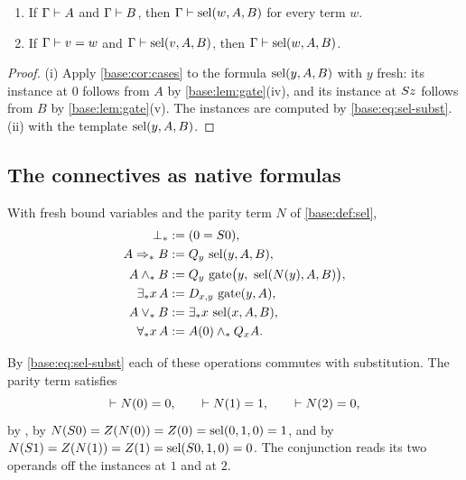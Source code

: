 \begin{lemma}
\label{base:lem:selIE}
\begin{enumerate}[label=\textup{(\roman*)}]
\item If $\Gamma\vdash A$ and $\Gamma\vdash B$, then
 $\Gamma\vdash\operatorname{sel}(w,A,B)$ for every term $w$.
\item If $\Gamma\vdash v=w$ and $\Gamma\vdash\operatorname{sel}(v,A,B)$, then
 $\Gamma\vdash\operatorname{sel}(w,A,B)$.
\end{enumerate}
\end{lemma}

\begin{proof}
(i) Apply \cref{base:cor:cases} to the formula $\operatorname{sel}(y,A,B)$ with $y$ fresh:
its instance at $0$ follows from $A$ by \cref{base:lem:gate}(iv), and its
instance at $S z$ follows from $B$ by \cref{base:lem:gate}(v).  The
instances are computed by \eqref{base:eq:sel-subst}.
(ii)  with the template $\operatorname{sel}(y,A,B)$.
\end{proof}

\subsection{The connectives as native formulas}

\begin{definition}
\label{base:def:macros}
With fresh bound variables and the parity term $N$ of \cref{base:def:sel},
\begin{align*}
 \bot_* &\mathrel{:=} (0=S 0),\\
 A\Rightarrow_* B &\mathrel{:=} Q_{y}\,\operatorname{sel}(y,A,B),\\
 A\wedge_* B &\mathrel{:=}
   Q_{y}\,\operatorname{gate}\bigl(y,\ \operatorname{sel}(N(y),A,B)\bigr),\\
 \exists_* x\,A &\mathrel{:=} D_{x,y}\,\operatorname{gate}(y,A),\\
 A\vee_* B &\mathrel{:=} \exists_* x\,\operatorname{sel}(x,A,B),\\
 \forall_* x\,A &\mathrel{:=} A(0)\wedge_*Q_{x}A .
\end{align*}
\end{definition}

By \eqref{base:eq:sel-subst} each of these operations commutes with
substitution.  The parity term satisfies
\begin{equation}
 \vdash N(0)=0,\qquad \vdash N(1)=1,\qquad \vdash N(2)=0,
 \label{base:eq:par012}
\end{equation}
by , by $N(S 0)=Z(N(0))=Z(0)=\operatorname{sel}(0,1,0)=1$, and by
$N(S 1)=Z(N(1))=Z(1)=\operatorname{sel}(S 0,1,0)=0$.  The conjunction reads its two
operands off the instances at $1$ and at $2$.

